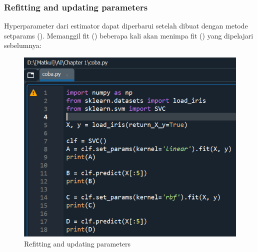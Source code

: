 \subsubsection{Refitting and updating parameters}

\par Hyperparameter dari estimator dapat diperbarui setelah dibuat dengan metode setparams (). Memanggil fit () beberapa kali akan menimpa fit () yang dipelajari sebelumnya:

    \begin{figure}[H]
    \centering
    \includegraphics[width=13cm]{figures/chapter1/24.PNG}
    \caption{Refitting and updating parameters}
    \end{figure}

